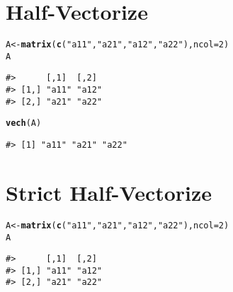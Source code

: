\documentclass{article}\usepackage[]{graphicx}\usepackage[]{color}
\makeatletter
\newcommand{\hlnum}[1]{\textcolor[rgb]{0.686,0.059,0.569}{#1}}%
\newcommand{\hlstr}[1]{\textcolor[rgb]{0.192,0.494,0.8}{#1}}%
\newcommand{\hlstd}[1]{\textcolor[rgb]{0.345,0.345,0.345}{#1}}%
\newcommand{\hlkwb}[1]{\textcolor[rgb]{0.69,0.353,0.396}{#1}}%
\newcommand{\hlkwc}[1]{\textcolor[rgb]{0.333,0.667,0.333}{#1}}%
\newcommand{\hlkwd}[1]{\textcolor[rgb]{0.737,0.353,0.396}{\textbf{#1}}}%
\newenvironment{kframe}{%
 \def\at@end@of@kframe{}%
 \ifinner\ifhmode%
  \def\at@end@of@kframe{\end{minipage}}%
  \begin{minipage}{\columnwidth}%
 \fi\fi%
 \def\FrameCommand##1{\hskip\@totalleftmargin \hskip-\fboxsep
 \colorbox{shadecolor}{##1}\hskip-\fboxsep
     \hskip-\linewidth \hskip-\@totalleftmargin \hskip\columnwidth}%
 \MakeFramed {\advance\hsize-\width
   \@totalleftmargin\z@ \linewidth\hsize
   \@setminipage}}%
 {\par\unskip\endMakeFramed%
 \at@end@of@kframe}
\newenvironment{knitrout}{}{} %
\makeatother
\begin{document}
\newpage

\section*{Half-Vectorize}





\begin{knitrout}
\color{fgcolor}\begin{kframe}
\begin{alltt}
\hlstd{A} \hlkwb{<-} \hlkwd{matrix}\hlstd{(}\hlkwd{c}\hlstd{(}\hlstr{"a11"}\hlstd{,} \hlstr{"a21"}\hlstd{,} \hlstr{"a12"}\hlstd{,} \hlstr{"a22"}\hlstd{),} \hlkwc{ncol} \hlstd{=} \hlnum{2}\hlstd{)}
\hlstd{A}
\end{alltt}
\begin{verbatim}
#>      [,1]  [,2] 
#> [1,] "a11" "a12"
#> [2,] "a21" "a22"
\end{verbatim}
\end{kframe}
\end{knitrout}

\begin{knitrout}
\color{fgcolor}\begin{kframe}
\begin{alltt}
\hlkwd{vech}\hlstd{(A)}
\end{alltt}
\begin{verbatim}
#> [1] "a11" "a21" "a22"
\end{verbatim}
\end{kframe}
\end{knitrout}

\newpage

\section*{Strict Half-Vectorize}





\begin{knitrout}
\color{fgcolor}\begin{kframe}
\begin{alltt}
\hlstd{A} \hlkwb{<-} \hlkwd{matrix}\hlstd{(}\hlkwd{c}\hlstd{(}\hlstr{"a11"}\hlstd{,} \hlstr{"a21"}\hlstd{,} \hlstr{"a12"}\hlstd{,} \hlstr{"a22"}\hlstd{),} \hlkwc{ncol} \hlstd{=} \hlnum{2}\hlstd{)}
\hlstd{A}
\end{alltt}
\begin{verbatim}
#>      [,1]  [,2] 
#> [1,] "a11" "a12"
#> [2,] "a21" "a22"
\end{verbatim}
\end{kframe}
\end{knitrout}
\end{document}
